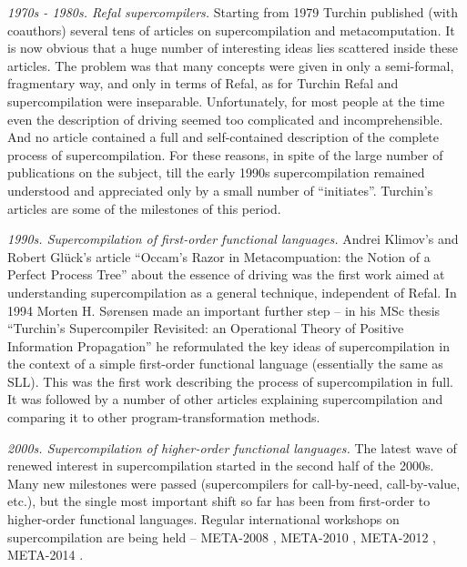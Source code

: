 \begin{longitem}

\item \emph{1970s - 1980s. Refal supercompilers.} Starting from 1979 Turchin
published (with coauthors) several tens of articles on supercompilation 
and metacomputation. 
It is now obvious that a huge number of interesting ideas lies scattered 
inside these articles.
The problem was that many concepts were given in only a semi-formal, fragmentary way,
and only in terms of Refal, as for Turchin Refal and supercompilation were inseparable.
Unfortunately, for most people at the time even the description of
driving seemed too complicated and incomprehensible.
And no article contained a full and self-contained description
of the complete process of supercompilation.
For these reasons, in spite of the large number of publications on the subject,
till the early 1990s supercompilation remained understood and appreciated
only by a small number of ``initiates''.
Turchin's articles \cite{Turchin1974EqTrans,Turchin1980Refal,Turchin1986Supercompiler,Turchin1988Generalization,Turchin1993Transformation,Turchin1996Supercompilation,Turchin1996Metacomputation}
are some of the milestones of this period.

\item \emph{1990s. Supercompilation of first-order functional languages.} Andrei
Klimov's and Robert Gl\"{u}ck's article
``Occam's Razor in Metacompuation: the Notion
of a Perfect Process Tree'' \cite{Gluck1993Occam} about the essence of driving
was the first work aimed at understanding supercompilation as a general technique,
independent of Refal.
In 1994 Morten H. S{\o}rensen made an important further step -- in his MSc thesis
``Turchin's Supercompiler Revisited: an Operational Theory of Positive Information Propagation''
\cite{Sorensen1994TurchinSupercompiler}
he reformulated the key ideas of supercompilation in the context of a simple
first-order functional language (essentially the same as SLL).
This was the first work describing the process of supercompilation in full.
It was followed by a number of other articles
\cite{Gluck1993Occam,Sorensen1994TurchinSupercompiler,Abramov1995meta,Sorensen1995Generalization,Gluck1996Roadmap,Sorensen1996Positive,Sorensen1998Introduction,Abramov2006meta2}
explaining supercompilation and comparing it to other program-transformation methods.

\item \emph{2000s. Supercompilation of higher-order functional languages.} The latest wave
of renewed interest in supercompilation started in the second half of the 2000s.
Many new milestones were passed (supercompilers for call-by-need, call-by-value, etc.),
but the single most important shift so far has been from first-order to higher-order functional
languages.
Regular international workshops on supercompilation are being held --
META-2008 \cite{Meta2008}, META-2010 \cite{Meta2010}, META-2012 \cite{Meta2012},
META-2014 \cite{Meta2014}.

\end{longitem}

